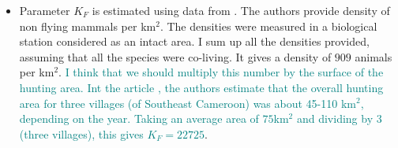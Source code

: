 \documentclass{article}
\newcommand{\marc}[1]{\textcolor{teal}{#1}}
\begin{document}
\begin{itemize}
\item Parameter $K_F$ is estimated using data from \cite{janson_ecological_1990}. The authors provide density of non flying mammals per km$^2$. The densities were measured in a biological station considered as an intact area. I sum up all the densities provided, assuming that all the species were co-living. It gives a density of $909$ animals per km$^2$. \marc{I think that we should multiply this number by the surface of the hunting area. Int the article \cite{avila_interpreting_2019}, the authors estimate that the overall hunting area for three villages (of Southeast Cameroon) was about 45-110 km$^2$, depending on the year. Taking an average area of $75$km$^2$ and dividing by 3 (three villages), this gives $K_F = 22725$}.




\end{itemize}



\newpage


\end{document}
